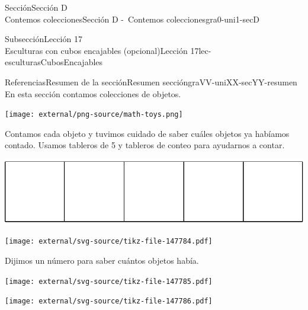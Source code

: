 \begin{sectionptx}{Sección}{{\Large Sección D\\}Contemos colecciones}{}{Sección D -~Contemos colecciones}{}{}{gra0-uni1-secD}
\begin{subsectionptx}{Subsección}{{\normalsize Lección 17\\[-0.05cm]}Esculturas con cubos encajables (opcional)}{}{Lección 17}{}{}{lec-esculturasCubosEncajables}
\end{subsectionptx}
%
%
\typeout{************************************************}
\typeout{************************************************}
%
\begin{references-subsection}{Referencias}{Resumen de la sección}{}{Resumen sección}{}{}{graVV-uniXX-secYY-resumen}
En esta sección contamos colecciones de objetos.%
\begin{image}{0.3}{0.4}{0.3}{}%
\texttt{[image: external/png-source/math-toys.png]}
\end{image}%
Contamos cada objeto y tuvimos cuidado de saber cuáles objetos ya habíamos contado. Usamos tableros de 5 y tableros de conteo para ayudarnos a contar.%
\begin{sidebyside}{2}{0}{0}{0}%
\begin{sbspanel}{0.4}%
\includegraphics[max width=\linewidth, center]{external/svg-source/tikz-file-148144.pdf}
\end{sbspanel}%
\begin{sbspanel}{0.6}%
\texttt{[image: external/svg-source/tikz-file-147784.pdf]}
\end{sbspanel}%
\end{sidebyside}%
\par
Dijimos un número para saber cuántos objetos había.%
\begin{sidebyside}{2}{0}{0}{0}%
\begin{sbspanel}{0.5}%
\texttt{[image: external/svg-source/tikz-file-147785.pdf]}
\end{sbspanel}%
\begin{sbspanel}{0.5}%
\texttt{[image: external/svg-source/tikz-file-147786.pdf]}
\end{sbspanel}%
\end{sidebyside}%
\end{references-subsection}
\end{sectionptx}
%
%
